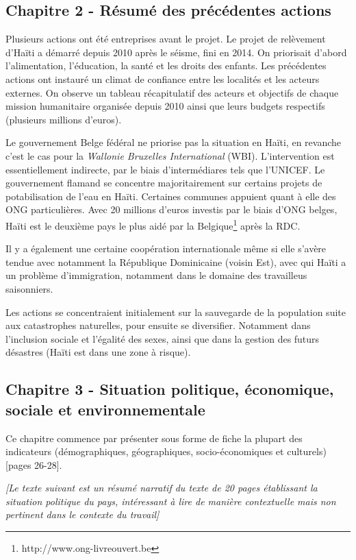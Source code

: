 \documentclass[a4paper, 11pt]{article}
\begin{document}
  \subsection*{Chapitre 2 - Résumé des précédentes actions}
  Plusieurs actions ont été entreprises avant le projet. Le projet de relèvement d'Haïti a démarré depuis 2010 après le séisme, fini en 2014. On priorisait d'abord l'alimentation, l'éducation, la santé et les droits des enfants. Les précédentes actions ont instauré un climat de confiance entre les localités et les acteurs externes. On observe un tableau récapitulatif des acteurs et objectifs de chaque mission humanitaire organisée depuis 2010 ainsi que leurs budgets respectifs (plusieurs millions d'euros).

  Le gouvernement Belge fédéral ne priorise pas la situation en Haïti, en revanche c'est le cas pour  la \textit{Wallonie Bruxelles International} (WBI). L'intervention est essentiellement indirecte, par le biais d'intermédiares tels que l'UNICEF. Le gouvernement flamand se concentre majoritairement sur certains projets de potabilisation de l'eau en Haïti. Certaines communes appuient quant à elle des ONG particulières. Avec 20 millions d'euros investis par le biais d'ONG belges, Haïti est le deuxième pays le plus aidé par la Belgique\footnote{http://www.ong-livreouvert.be} après la RDC.

  Il y a également une certaine coopération internationale même si elle s'avère tendue avec notamment la République Dominicaine (voisin Est), avec qui Haïti a un problème d'immigration, notamment dans le domaine des travailleus saisonniers.

  Les actions se concentraient initialement sur la sauvegarde de la population suite aux catastrophes naturelles, pour ensuite se diversifier. Notamment dans l'inclusion sociale et l'égalité des sexes, ainsi que dans la gestion des futurs désastres (Haïti est dans une zone à risque).

  \subsection*{Chapitre 3 - Situation politique, économique, sociale et environnementale}
  Ce chapitre commence par présenter sous forme de fiche la plupart des indicateurs (démographiques, géographiques, socio-économiques et culturels) [pages 26-28].\bigskip

  \textit{[Le texte suivant est un résumé narratif du texte de 20 pages établissant la situation politique du pays, intéressant à lire de manière contextuelle mais non pertinent dans le contexte du travail]}
\end{document}
